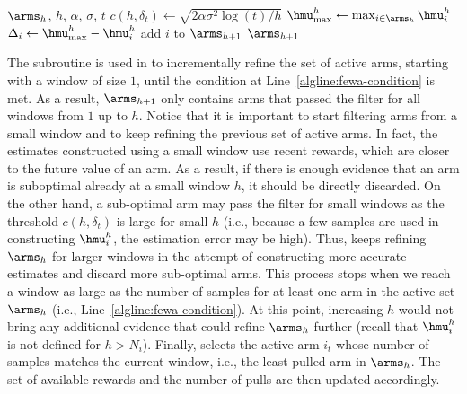 \begin{algorithm}[!ht]
\caption{{\FILTER}}
\label{alg:filter}
\begin{algorithmic}[1]
\Require $\arms_{h}$, $h$, $\alpha$, $\sigma$, $t$
\State $c(h, \delta_t) \leftarrow \sqrt{2\alpha\sigma^2\log{(t)}/h }$
\State $\hmu^h_{\max}  \leftarrow \max_{i \in \arms_{h}}\hmu_i^h$\label{algline:filter-max}
	\State $\Delta_i \leftarrow  \hmu^h_{\max} - \hmu^h_{i} $ \label{algline:filter-delta}
	\State add $i$ to $\arms_{h+1}$ \label{algline:filter-add}
	\EndIf
\EndFor
\Ensure $\arms_{h+1}$
\end{algorithmic}
\end{algorithm}



The \FILTER subroutine is used in \FEWA to incrementally refine the set of active arms, starting with a window of size $1$, until the condition at Line~\ref{algline:fewa-condition} is met. As a result, $\arms_{h+1}$ only contains arms that passed the filter for all windows from $1$ up to $h$. Notice that it is important to start filtering arms from a small window and to keep refining the previous set of active arms. 
In fact, the estimates constructed using a small window use recent rewards, which are closer to the future value of an arm. As a result, if there is enough evidence that an arm is suboptimal already at a small window $h$, it should be directly discarded. On the other hand, a sub-optimal arm may pass the filter for small windows as the threshold $c(h , \delta_t)$ is large for small $h$ (i.e., because a few samples are used in constructing $\hmu_i^h$, the estimation error may be high). Thus, \FEWA keeps refining $\arms_{h}$ for larger windows in the attempt of constructing more accurate estimates and discard more sub-optimal arms. This process stops when we reach a window as large as the number of samples for at least one arm in the active set $\arms_{h}$ (i.e., Line~\ref{algline:fewa-condition}). At this point, increasing $h$ would not bring any additional evidence that could refine $\arms_{h}$ further (recall that $\hmu^h_i$ is not defined for $h > N_i$). Finally,  \FEWA selects the active arm $i_t$ whose number of samples matches the current window, i.e., the least pulled arm in $\arms_{h}$. The set of available rewards and the number of pulls are then updated accordingly. 

